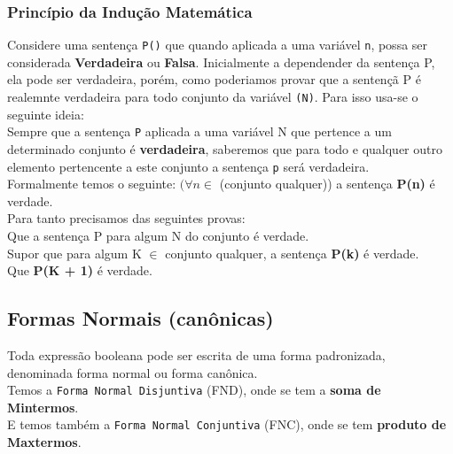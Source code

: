 \documentclass[12pt, onecolumn]{article}
\begin{document}
		\subsubsection{\centering Princípio da Indução Matemática}
	
	Considere uma sentença \texttt{P()} que quando aplicada a uma variável 
	\texttt{n}, possa ser considerada \textbf{Verdadeira} ou \textbf{Falsa}.
	Inicialmente a dependender da sentença P, ela pode ser verdadeira, porém,
	como poderiamos provar que a sentençã P é realemnte verdadeira para todo
	conjunto da variável \texttt{(N)}. Para isso usa-se o seguinte ideia:\\
	\newline
	Sempre que a sentença \texttt{P} aplicada a uma variável N que pertence a um
	determinado conjunto é \textbf{verdadeira}, saberemos que para todo
	e qualquer outro elemento pertencente a este conjunto a sentença \texttt{p}
	será verdadeira.\\
	\newline
	Formalmente temos o seguinte: $(\forall n \in$ (conjunto qualquer))
	a sentença \textbf{P(n)} é verdade. \\
	\newline
	Para tanto precisamos das seguintes provas: \\
	\newline
	Que a sentença P para algum N do conjunto é verdade.\\
	\newline
	Supor que para algum K $\in$ conjunto qualquer, 
	a sentença \textbf{P(k)} é verdade.\\
	\newline
	Que \textbf{P(K + 1)} é verdade.

			\subsection{\centering Formas Normais (canônicas)}
	
	Toda expressão booleana pode ser escrita de uma forma padronizada, 
	denominada forma normal ou forma canônica. \\

	Temos a \texttt{Forma Normal Disjuntiva} (FND), onde se tem a 
	\textbf{soma de Mintermos}. \\
	
	E temos também a \texttt{Forma Normal Conjuntiva} (FNC), onde se tem
	\textbf{produto de Maxtermos}. \\
\end{document}
